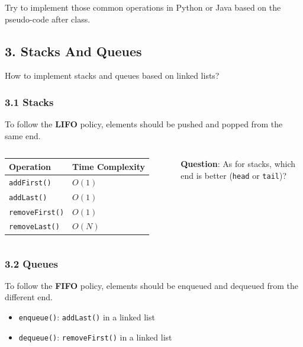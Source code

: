 \documentclass[aspectratio=169, 14pt]{beamer}
\begin{document}
{
\begin{frame}[standout]
Try to implement those common operations in Python or Java based on the pseudo-code after class.
\end{frame}
}

\begin{frame}
    \section{\textcolor{darkmidnightblue}{3. Stacks And Queues}} 
    How to implement stacks and queues based on linked lists?
\end{frame}

\begin{frame}
    \frametitle{3.1 Stacks}
    
To follow the \textbf{LIFO} policy, elements should be pushed and popped from the same end.


\begin{columns}
    \begin{table}
        \begin{tabular}{ll}
          \toprule
          Operation & Time Complexity \\
          \midrule
          \texttt{addFirst()} & $O(1)$\\
          \texttt{addLast()} & $O(1)$ \\
          \texttt{removeFirst()} & $O(1)$ \\
          \texttt{removeLast()} & $O(N)$ \\
          \bottomrule
        \end{tabular}
    \end{table}
    {\large {}} \textbf{Question}: As for stacks, which end is better (\texttt{head} or \texttt{tail})?
\end{columns}

\end{frame}

\begin{frame}
    \frametitle{3.2 Queues}
To follow the \textbf{FIFO} policy, elements should be enqueued and dequeued from the different end.

\begin{itemize}
    \item \texttt{enqueue()}: \texttt{addLast()} in a linked list
    \item \texttt{dequeue()}: \texttt{removeFirst()} in a linked list
\end{itemize}

\end{frame}
\end{document}
